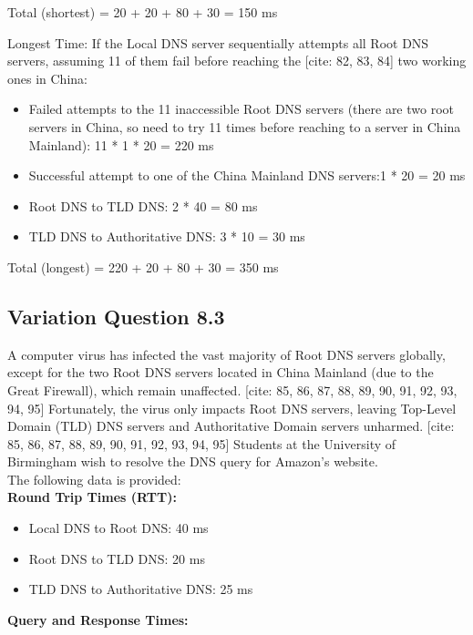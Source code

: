 Total (shortest) = 20 + 20 + 80 + 30 = 150 ms

Longest Time: If the Local DNS server sequentially attempts all Root DNS servers, 
assuming 11 of them fail before reaching the
[cite: 82, 83, 84] two working ones in China:

\begin{itemize}
    \item Failed attempts to the 11 inaccessible Root DNS servers (there are two root 
servers in China, so need to try 11 times before reaching to a server in China 
Mainland): 11 * 1 * 20 = 220 ms
    \item Successful attempt to one of the China Mainland DNS servers:1 * 20 = 20 ms
    \item Root DNS to TLD DNS: 2 * 40 = 80 ms
    \item TLD DNS to Authoritative DNS: 3 * 10 = 30 ms
\end{itemize}

Total (longest) = 220 + 20 + 80 + 30 = 350 ms

\subsection{Variation Question 8.3}

A computer virus has infected the vast majority of Root DNS servers 
globally, except for the two Root DNS servers located in China Mainland 
(due to the Great Firewall), which remain unaffected. [cite: 85, 86, 87, 88, 89, 90, 91, 92, 93, 94, 95] Fortunately, the 
virus only impacts Root DNS servers, leaving Top-Level Domain (TLD) 
DNS servers and Authoritative Domain servers unharmed. [cite: 85, 86, 87, 88, 89, 90, 91, 92, 93, 94, 95] Students at the 
University of Birmingham wish to resolve the DNS query for Amazon's 
website. \\
The following data is provided:\\

\textbf{Round Trip Times (RTT):}\\

\begin{itemize}
    \item Local DNS to Root DNS: 40 ms
    \item Root DNS to TLD DNS: 20 ms
    \item TLD DNS to Authoritative DNS: 25 ms
\end{itemize}

\textbf{Query and Response Times:}

